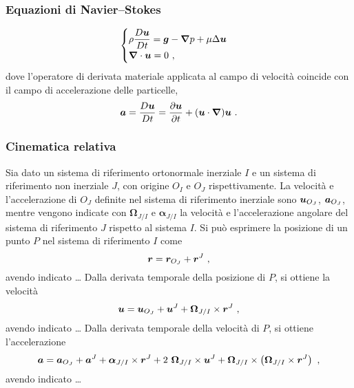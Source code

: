 
\subsubsection{Equazioni di Navier--Stokes}
\begin{equation}
\begin{cases}
 \rho \dfrac{D \bm{u}}{D t} = \bm{g} - \bm{\nabla} p + \mu \Delta \bm{u} \\
 \bm{\nabla} \cdot \bm{u} = 0 \ ,
\end{cases}
\end{equation}
dove l'operatore di derivata materiale applicata al campo di velocità coincide con il campo di accelerazione delle particelle,
\begin{equation}
 \bm{a} = \dfrac{D \bm{u}}{D t} = \dfrac{\partial \bm{u}}{\partial t} + ( \bm{u} \cdot \bm{\nabla} ) \bm{u} \ .
\end{equation}

\subsubsection{Cinematica relativa}
Sia dato un sistema di riferimento ortonormale inerziale $I$ e un sistema di riferimento non inerziale $J$, con origine $O_I$ e $O_J$ rispettivamente. La velocità e l'accelerazione di $O_J$ definite nel sistema di riferimento inerziale sono $\bm{u}_{O_J}$, $\bm{a}_{O_J}$, mentre vengono indicate con $\bm{\Omega}_{J/I}$ e $\bm{\alpha}_{J/I}$ la velocità e l'accelerazione angolare del sistema di riferimento $J$ rispetto al sistema $I$. Si può esprimere la posizione di un punto $P$ nel sistema di riferimento $I$ come
\begin{equation}
 \pos = \pos_{O_J} + \pos^J \ ,
\end{equation}
avendo indicato \dots
Dalla derivata temporale della posizione di $P$, si ottiene la velocità
\begin{equation}
 \bm{u} = \bm{u}_{O_J} + \bm{u}^J + \bm{\Omega}_{J/I} \times \bm{r}^J \ ,
\end{equation}
avendo indicato \dots
Dalla derivata temporale della velocità di $P$, si ottiene l'accelerazione
\begin{equation}
 \bm{a} = \bm{a}_{O_J} + \bm{a}^J + \bm{\alpha}_{J/I} \times \bm{r}^J + 2~\bm{\Omega}_{J/I} \times \bm{u}^J + 
   \bm{\Omega}_{J/I} \times \left( \bm{\Omega}_{J/I} \times \bm{r}^J \right) \ ,
\end{equation}
avendo indicato \dots

